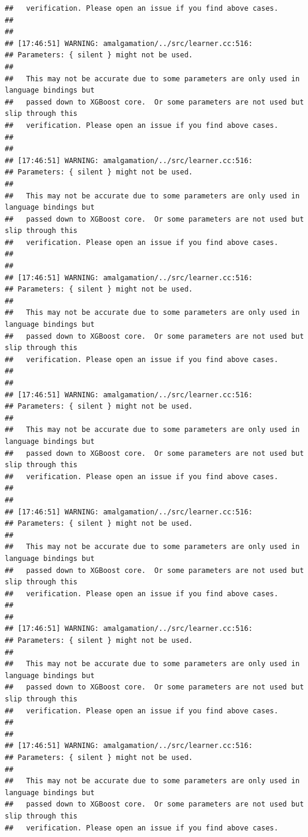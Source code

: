 \documentclass[AMS,STIX2COL]{WileyNJD-v2}\usepackage[]{graphicx}\usepackage[]{color}
\makeatletter
\newenvironment{kframe}{%
 \def\at@end@of@kframe{}%
 \ifinner\ifhmode%
  \def\at@end@of@kframe{\end{minipage}}%
  \begin{minipage}{\columnwidth}%
 \fi\fi%
 \def\FrameCommand##1{\hskip\@totalleftmargin \hskip-\fboxsep
 \colorbox{shadecolor}{##1}\hskip-\fboxsep
     \hskip-\linewidth \hskip-\@totalleftmargin \hskip\columnwidth}%
 \MakeFramed {\advance\hsize-\width
   \@totalleftmargin\z@ \linewidth\hsize
   \@setminipage}}%
 {\par\unskip\endMakeFramed%
 \at@end@of@kframe}
\newenvironment{knitrout}{}{} %
\makeatother
\begin{document}
\begin{knitrout}
\begin{kframe}
\begin{verbatim}
##   verification. Please open an issue if you find above cases.
## 
## 
## [17:46:51] WARNING: amalgamation/../src/learner.cc:516: 
## Parameters: { silent } might not be used.
## 
##   This may not be accurate due to some parameters are only used in language bindings but
##   passed down to XGBoost core.  Or some parameters are not used but slip through this
##   verification. Please open an issue if you find above cases.
## 
## 
## [17:46:51] WARNING: amalgamation/../src/learner.cc:516: 
## Parameters: { silent } might not be used.
## 
##   This may not be accurate due to some parameters are only used in language bindings but
##   passed down to XGBoost core.  Or some parameters are not used but slip through this
##   verification. Please open an issue if you find above cases.
## 
## 
## [17:46:51] WARNING: amalgamation/../src/learner.cc:516: 
## Parameters: { silent } might not be used.
## 
##   This may not be accurate due to some parameters are only used in language bindings but
##   passed down to XGBoost core.  Or some parameters are not used but slip through this
##   verification. Please open an issue if you find above cases.
## 
## 
## [17:46:51] WARNING: amalgamation/../src/learner.cc:516: 
## Parameters: { silent } might not be used.
## 
##   This may not be accurate due to some parameters are only used in language bindings but
##   passed down to XGBoost core.  Or some parameters are not used but slip through this
##   verification. Please open an issue if you find above cases.
## 
## 
## [17:46:51] WARNING: amalgamation/../src/learner.cc:516: 
## Parameters: { silent } might not be used.
## 
##   This may not be accurate due to some parameters are only used in language bindings but
##   passed down to XGBoost core.  Or some parameters are not used but slip through this
##   verification. Please open an issue if you find above cases.
## 
## 
## [17:46:51] WARNING: amalgamation/../src/learner.cc:516: 
## Parameters: { silent } might not be used.
## 
##   This may not be accurate due to some parameters are only used in language bindings but
##   passed down to XGBoost core.  Or some parameters are not used but slip through this
##   verification. Please open an issue if you find above cases.
## 
## 
## [17:46:51] WARNING: amalgamation/../src/learner.cc:516: 
## Parameters: { silent } might not be used.
## 
##   This may not be accurate due to some parameters are only used in language bindings but
##   passed down to XGBoost core.  Or some parameters are not used but slip through this
##   verification. Please open an issue if you find above cases.

\end{verbatim}
\end{kframe}
\end{knitrout}
\end{document}
